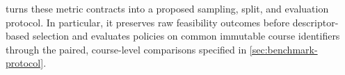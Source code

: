  turns these metric contracts into a proposed sampling,
split, and evaluation protocol. In particular, it preserves raw feasibility outcomes
before descriptor-based selection and evaluates policies on common immutable course
identifiers through the paired, course-level comparisons specified in
\cref{sec:benchmark-protocol}.
